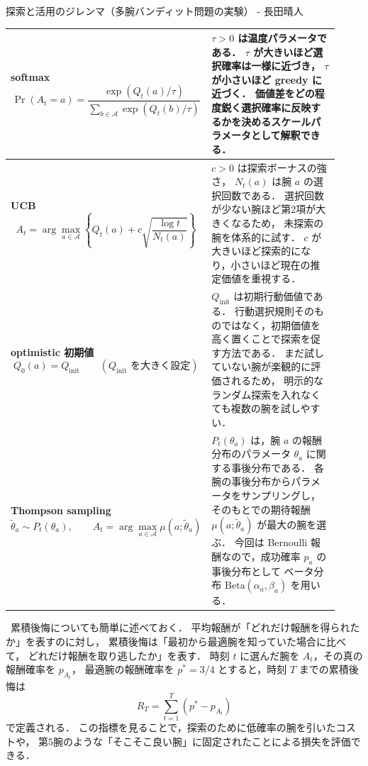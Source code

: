 \begin{column}{探索と活用のジレンマ（多腕バンディット問題の実験） - 長田晴人}
\begin{center}
\begin{tabular}{p{0.42\linewidth}p{0.50\linewidth}}
      \midrule

      \textbf{softmax}
      \[
      \Pr(A_t=a)
      =
      \frac{\exp(Q_t(a)/\tau)}
      {\sum_{b\in\mathcal{A}}\exp(Q_t(b)/\tau)}
      \]
      &
      $\tau>0$ は温度パラメータである．
      $\tau$ が大きいほど選択確率は一様に近づき，
      $\tau$ が小さいほど greedy に近づく．
      価値差をどの程度鋭く選択確率に反映するかを決めるスケールパラメータとして解釈できる．
      \\

      \midrule

      \textbf{UCB}
      \[
      A_t
      =
      \arg\max_{a\in\mathcal{A}}
      \left\{
      Q_t(a)
      +
      c\sqrt{\frac{\log t}{N_t(a)}}
      \right\}
      \]
      &
      $c>0$ は探索ボーナスの強さ，
      $N_t(a)$ は腕 $a$ の選択回数である．
      選択回数が少ない腕ほど第2項が大きくなるため，
      未探索の腕を体系的に試す．
      $c$ が大きいほど探索的になり，小さいほど現在の推定価値を重視する．
      \\

      \midrule

      \textbf{optimistic 初期値}
      \[
      Q_0(a)=Q_{\mathrm{init}}
      \qquad
      (Q_{\mathrm{init}}\text{ を大きく設定})
      \]
      &
      $Q_{\mathrm{init}}$ は初期行動価値である．
      行動選択規則そのものではなく，初期価値を高く置くことで探索を促す方法である．
      まだ試していない腕が楽観的に評価されるため，
      明示的なランダム探索を入れなくても複数の腕を試しやすい．
      \\

      \midrule

      \textbf{Thompson sampling}
      \[
      \tilde{\theta}_a \sim P_t(\theta_a),
      \qquad
      A_t=\arg\max_{a\in\mathcal{A}}\mu(a;\tilde{\theta}_a)
      \]
      &
      $P_t(\theta_a)$ は，腕 $a$ の報酬分布のパラメータ $\theta_a$ に関する事後分布である．
      各腕の事後分布からパラメータをサンプリングし，
      そのもとでの期待報酬 $\mu(a;\tilde{\theta}_a)$ が最大の腕を選ぶ．
      今回は Bernoulli 報酬なので，成功確率 $p_a$ の事後分布として
      ベータ分布 $\mathrm{Beta}(\alpha_a,\beta_a)$ を用いる．
      \\

      \bottomrule
    \end{tabular}
\end{center}

\ 累積後悔についても簡単に述べておく．
平均報酬が「どれだけ報酬を得られたか」を表すのに対し，
累積後悔は「最初から最適腕を知っていた場合に比べて，
どれだけ報酬を取り逃したか」を表す．
時刻 $t$ に選んだ腕を $A_t$，その真の報酬確率を $p_{A_t}$，
最適腕の報酬確率を $p^\ast=3/4$ とすると，時刻 $T$ までの累積後悔は
\[
    R_T=\sum_{t=1}^{T}\left(p^\ast-p_{A_t}\right)
\]
で定義される．
この指標を見ることで，探索のために低確率の腕を引いたコストや，
第5腕のような「そこそこ良い腕」に固定されたことによる損失を評価できる．


\end{column}
